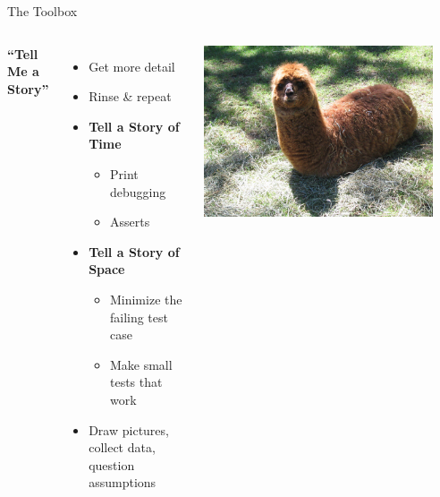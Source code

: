 \documentclass[xcolor=dvipsnames]{beamer}
\begin{document}
\begin{frame}{The Toolbox}
	\begin{columns}[l]
	\textbf{``Tell Me a Story''}
	\begin{itemize}
		\item Get more detail
		\item Rinse \& repeat
		\pause
		\item {\bf Tell a Story of Time}
		\begin{itemize}
			\item Print debugging
			\item Asserts
		\end{itemize}
		\pause
		\item {\bf Tell a Story of Space}
		\begin{itemize}
			\item Minimize the failing test case
			\item Make small tests that work
		\end{itemize}
		\pause
		\item Draw pictures, collect data, question assumptions
	\end{itemize}
	\pause
	\begin{center}
		\includegraphics[width=0.9\textwidth]{vip1066720.jpg}
	\end{center}
	\end{columns}
\end{frame}
\end{document}
